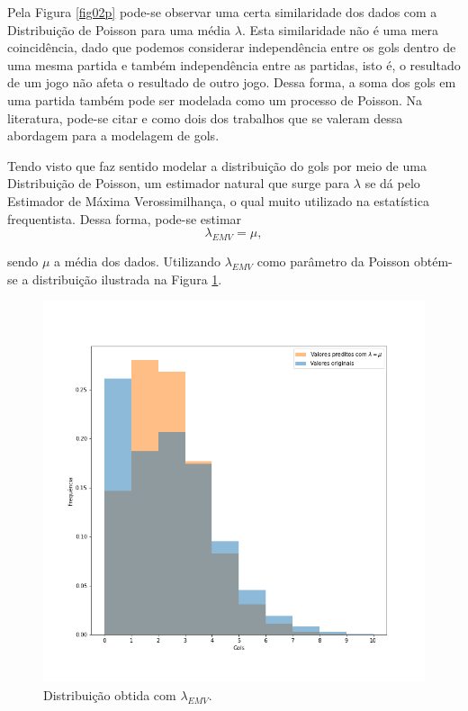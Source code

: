 \documentclass[11pt,letterpaper,twocolumn]{article}
\begin{document}
Pela Figura \ref{fig02p} pode-se observar uma certa similaridade dos dados com a Distribuição de Poisson para uma média $\lambda$. Esta similaridade não é uma mera coincidência, dado que podemos considerar independência entre os gols dentro de uma mesma partida e também independência entre as partidas, isto é, o resultado de um jogo não afeta o resultado de outro jogo. Dessa forma, a soma dos gols em uma partida também pode ser modelada como um processo de Poisson. Na literatura, pode-se citar \cite{poissoninan} e \cite{poissonmaher} como dois dos trabalhos que se valeram dessa abordagem para a modelagem de gols.

Tendo visto que faz sentido modelar a distribuição do gols por meio de uma Distribuição de Poisson, um estimador natural que surge para $\lambda$ se dá pelo Estimador de Máxima Verossimilhança, o qual muito utilizado na estatística frequentista. Dessa forma, pode-se estimar
\begin{equation}
    \lambda_{EMV} = \mu,
\end{equation}

\noindent sendo $\mu$ a média dos dados. Utilizando $\lambda_{EMV}$ como parâmetro da Poisson obtém-se a distribuição ilustrada na Figura \ref{fig04p}.
\begin{figure}[hbt]
    \centering
    \includegraphics[scale = 0.40, center]{Poisson/fig04 - poisson.png}
    \caption{Distribuição obtida com $\lambda_{EMV}$.}
    \label{fig04p}
\end{figure}
\end{document}
